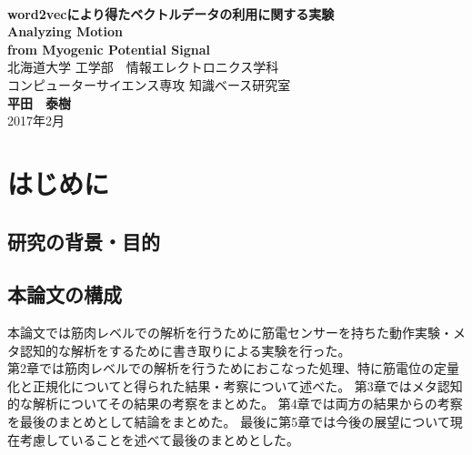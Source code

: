 \documentclass[11pt,a4j,notitlepage]{jreport}
\def\HUGE{\fontsize{32pt}{36pt}\selectfont} %
\begin{document}
%
\begin{titlepage}
\begin{center}\begin{LARGE}
\vspace*{3.5em}{平成28年度　卒業論文}\vspace{1em}\\
\textbf{\HUGE word2vecにより得たベクトルデータの利用に関する実験}\\
\vspace{0.8em}
{\LARGE\bf Analyzing Motion \\from Myogenic Potential Signal}
\vspace{0.28\vsize}\\
{北海道大学 工学部　情報エレクトロニクス学科\\コンピューターサイエンス専攻 知識ベース研究室}\\\vspace{0.8em}
{\Huge\bf 平田　泰樹}\\
\vspace{1em}
{\Large 2017年2月}
\end{LARGE}\end{center}
\end{titlepage}

\tableofcontents

\chapter{はじめに}
\section{研究の背景・目的}



\section{本論文の構成}
 本論文では筋肉レベルでの解析を行うために筋電センサーを持ちた動作実験・メタ認知的な解析をするために書き取りによる実験を行った。\\
第2章では筋肉レベルでの解析を行うためにおこなった処理、特に筋電位の定量化と正規化についてと得られた結果・考察について述べた。
第3章ではメタ認知的な解析についてその結果の考察をまとめた。
第4章では両方の結果からの考察を最後のまとめとして結論をまとめた。
最後に第5章では今後の展望について現在考慮していることを述べて最後のまとめとした。
\end{document}

